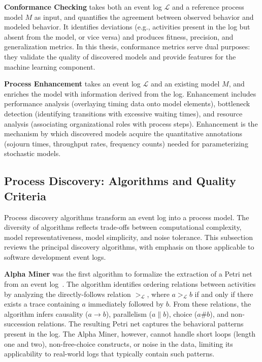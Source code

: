 \textbf{Conformance Checking} takes both an event log $\mathcal{L}$ and a
reference process model $M$ as input, and quantifies the agreement between
observed behavior and modeled behavior. It identifies deviations (e.g.,
activities present in the log but absent from the model, or vice versa)
and produces fitness, precision, and generalization metrics. In this thesis,
conformance metrics serve dual purposes: they validate the quality of
discovered models and provide features for the machine learning component.

\textbf{Process Enhancement} takes an event log $\mathcal{L}$ and an
existing model $M$, and enriches the model with information derived from
the log. Enhancement includes performance analysis (overlaying timing data
onto model elements), bottleneck detection (identifying transitions with
excessive waiting times), and resource analysis (associating organizational
roles with process steps). Enhancement is the mechanism by which discovered
models acquire the quantitative annotations (sojourn times, throughput rates,
frequency counts) needed for parameterizing stochastic models.


\subsection{Process Discovery: Algorithms and Quality Criteria}
\label{sec:process-discovery}

Process discovery algorithms transform an event log into a process model.
The diversity of algorithms reflects trade-offs between computational
complexity, model representativeness, model simplicity, and noise
tolerance. This subsection reviews the principal discovery algorithms,
with emphasis on those applicable to software development event logs.

\textbf{Alpha Miner} was the first algorithm to formalize the extraction
of a Petri net from an event log~\cite{aalst2004workflow}. The algorithm
identifies ordering relations between activities by analyzing the
directly-follows relation $>_\mathcal{L}$, where $a >_\mathcal{L} b$ if
and only if there exists a trace containing $a$ immediately followed by
$b$. From these relations, the algorithm infers causality ($a \rightarrow b$),
parallelism ($a \| b$), choice ($a \# b$), and non-succession relations.
The resulting Petri net captures the behavioral patterns present in the log.
The Alpha Miner, however, cannot handle short loops (length one and two),
non-free-choice constructs, or noise in the data, limiting its applicability
to real-world logs that typically contain such patterns.

